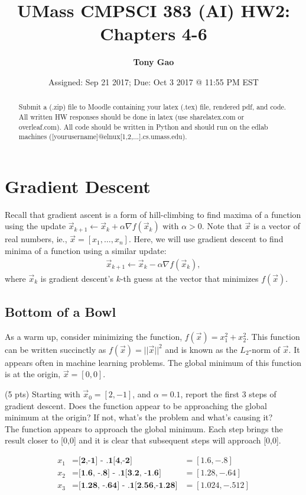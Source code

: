 \documentclass{article}
\title{UMass CMPSCI 383 (AI) HW2: Chapters 4-6}
\author{\textbf{Tony Gao}}
\date{Assigned: Sep 21 2017; Due: Oct 3 2017 @ 11:55 PM EST}
\begin{document}
\maketitle

\begin{abstract}
    Submit a (.zip) file to Moodle containing your latex (.tex) file, rendered pdf, and code. All written HW responses should be done in latex (use sharelatex.com or overleaf.com). All code should be written in Python and should run on the edlab machines ([yourusername]@elnux[1,2,...].cs.umass.edu).
\end{abstract}

\section{Gradient Descent}
Recall that gradient ascent is a form of hill-climbing to find maxima of a function using the update $\vec{x}_{k+1} \leftarrow \vec{x}_k + \alpha \nabla f (\vec{x}_k)$ with $\alpha > 0$. Note that $\vec{x}$ is a vector of real numbers, ie., $\vec{x} = [x_1,\ldots,x_n]$. Here, we will use gradient descent to find minima of a function using a similar update:
\begin{align}
\vec{x}_{k+1} \leftarrow \vec{x}_k - \alpha \nabla f (\vec{x}_k),
\end{align}
where $\vec{x}_k$ is gradient descent's $k$-th guess at the vector that minimizes $f(\vec{x})$.

\subsection{Bottom of a Bowl}
As a warm up, consider minimizing the function, $f(\vec{x}) = x_1^2 + x_2^2$. This function can be written succinctly as $f(\vec{x}) = ||\vec{x}||^2$ and is known as the $L_2$-norm of $\vec{x}$. It appears often in machine learning problems. The global minimum of this function is at the origin, $\vec{x}=[0,0]$.

(5 pts) Starting with $\vec{x}_0 = [2,-1]$, and $\alpha = 0.1$, report the first 3 steps of gradient descent. Does the function appear to be approaching the global minimum at the origin? If not, what's the problem and what's causing it?\\

The function appears to approach the global minimum. Each step brings the result closer to [0,0] and it is clear that subsequent steps will approach [0,0].

\begin{align}
    x_1 &= \textbf{[2,-1] - .1[4,-2] } &= [1.6, -.8]  \\
    x_2 &= \textbf{[1.6, -.8] - .1[3.2, -1.6]} &= [1.28, -.64] \\
    x_3 &= \textbf{[1.28, -.64] - .1[2.56,-1.28]} &= [1.024, -.512]
\end{align}
\end{document}
